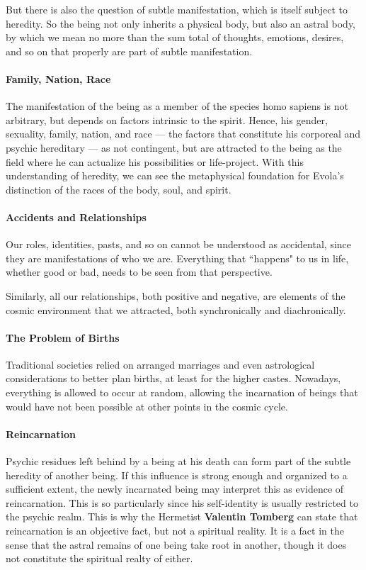 But there is also the question of subtle manifestation, which is itself subject to heredity. So the being not only inherits a physical body, but also an astral body, by which we mean no more than the sum total of thoughts, emotions, desires, and so on that properly are part of subtle manifestation.

\paragraph{Family, Nation, Race}
The manifestation of the being as a member of the species homo sapiens is not arbitrary, but depends on factors intrinsic to the spirit. Hence, his gender, sexuality, family, nation, and race — the factors that constitute his corporeal and psychic hereditary — as not contingent, but are attracted to the being as the field where he can actualize his possibilities or life-project. With this understanding of heredity, we can see the metaphysical foundation for Evola's distinction of the races of the body, soul, and spirit.

\paragraph{Accidents and Relationships}
Our roles, identities, pasts, and so on cannot be understood as accidental, since they are manifestations of who we are. Everything that ``happens" to us in life, whether good or bad, needs to be seen from that perspective.

Similarly, all our relationships, both positive and negative, are elements of the cosmic environment that we attracted, both synchronically and diachronically.

\paragraph{The Problem of Births}
Traditional societies relied on arranged marriages and even astrological considerations to better plan births, at least for the higher castes. Nowadays, everything is allowed to occur at random, allowing the incarnation of beings that would have not been possible at other points in the cosmic cycle.

\paragraph{Reincarnation}
Psychic residues left behind by a being at his death can form part of the subtle heredity of another being. If this influence is strong enough and organized to a sufficient extent, the newly incarnated being may interpret this as evidence of reincarnation. This is so particularly since his self-identity is usually restricted to the psychic realm. This is why the Hermetist \textbf{Valentin Tomberg} can state that reincarnation is an objective fact, but not a spiritual reality. It is a fact in the sense that the astral remains of one being take root in another, though it does not constitute the spiritual realty of either.

